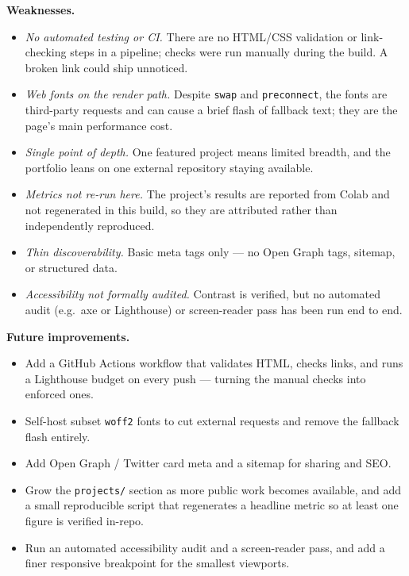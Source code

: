 \documentclass[11pt,a4paper]{article}
\begin{document}
\textbf{Weaknesses.}
\begin{itemize}
  \item \emph{No automated testing or CI.} There are no HTML/CSS validation or
        link-checking steps in a pipeline; checks were run manually during the
        build. A broken link could ship unnoticed.
  \item \emph{Web fonts on the render path.} Despite \texttt{swap} and
        \texttt{preconnect}, the fonts are third-party requests and can cause a
        brief flash of fallback text; they are the page's main performance cost.
  \item \emph{Single point of depth.} One featured project means limited breadth,
        and the portfolio leans on one external repository staying available.
  \item \emph{Metrics not re-run here.} The project's results are reported from
        Colab and not regenerated in this build, so they are attributed rather
        than independently reproduced.
  \item \emph{Thin discoverability.} Basic meta tags only --- no Open Graph
        tags, sitemap, or structured data.
  \item \emph{Accessibility not formally audited.} Contrast is verified, but no
        automated audit (e.g.\ axe or Lighthouse) or screen-reader pass has been
        run end to end.
\end{itemize}

\textbf{Future improvements.}
\begin{itemize}
  \item Add a GitHub Actions workflow that validates HTML, checks links, and runs
        a Lighthouse budget on every push --- turning the manual checks into
        enforced ones.
  \item Self-host subset \texttt{woff2} fonts to cut external requests and remove
        the fallback flash entirely.
  \item Add Open Graph / Twitter card meta and a sitemap for sharing and SEO.
  \item Grow the \texttt{projects/} section as more public work becomes available,
        and add a small reproducible script that regenerates a headline metric so
        at least one figure is verified in-repo.
  \item Run an automated accessibility audit and a screen-reader pass, and add a
        finer responsive breakpoint for the smallest viewports.
\end{itemize}
\end{document}
